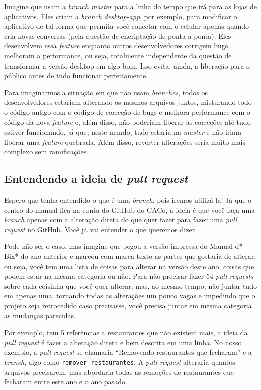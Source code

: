 \documentclass[a4paper,oneside,10pt]{memoir}
\begin{document}
Imagine que usam a \emph{branch master} para a linha do tempo que irá para as
lojas de aplicativos. Eles criam a \emph{branch desktop-app}, por exemplo, para
modificar o aplicativo de tal forma que permita você conectar com o celular
apenas quando cria novas conversas (pela questão de encriptação de
ponta-a-ponta). Eles desenvolvem essa \emph{feature} enquanto outros
desenvolvedores corrigem bugs, melhoram a performance, ou seja, totalmente
independente da questão de transformar a versão desktop em algo bom. Isso
evita, ainda, a liberação para o público antes de tudo funcionar perfeitamente.

Para imaginarmos a situação em que não usam \emph{branches}, todos os
desenvolvedores estariam alterando os mesmos arquivos juntos, misturando todo o
código antigo com o código de correção de bugs e melhora performance com o
código da nova \emph{feature} e, além disso, não poderiam liberar as correções
até tudo estiver funcionando, já que, neste mundo, tudo estaria na
\emph{master} e não iriam liberar uma \emph{feature} quebrada. Além disso,
reverter alterações seria muito mais complexo sem ramificações.

\subsection{Entendendo a ideia de \emph{pull request}}

Espero que tenha entendido o que é uma \emph{branch}, pois iremos utilizá-la!
Já que o centro do manual fica na conta do GitHub do CACo, a ideia é que você
faça uma \emph{branch} apenas com a alteração direta do que quer fazer para
fazer uma \emph{pull request} no GitHub. Você já vai entender o que queremos
dizer.

Pode não ser o caso, mas imagine que pegou a versão impressa do Manual d* Bix*
do ano anterior e marcou com marca texto as partes que gostaria de alterar, ou
seja, você tem uma lista de coisas para alterar na versão deste ano, coisas que
podem estar na mesma categoria ou não. Para não precisar fazer 54 \emph{pull
requests} sobre cada coisinha que você quer alterar, mas, ao mesmo tempo, não
juntar tudo em apenas uma, tornando todas as alterações um pouco vagas e
impedindo que o projeto seja retrocedido caso precisasse, você precisa juntar
em mesma categoria as mudanças parecidas.

Por exemplo, tem 5 referências a restaurantes que não existem mais, a ideia da
\emph{pull request} é fazer a alteração direta e bem descrita em uma linha. No
nosso exemplo, a \emph{pull request} se chamaria ``Removendo restaurantes que
fecharam'' e a \emph{branch}, algo como \texttt{remover-restaurantes}. A
\emph{pull request} alteraria quantos arquivos precisarem, mas abordaria todas
as remoções de restaurantes que fecharam entre este ano e o ano pasado.
\end{document}
